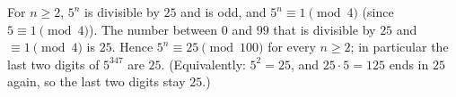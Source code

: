 For $n\ge2$, $5^n$ is divisible by $25$ and is odd, and $5^n\equiv1\pmod4$ (since $5\equiv1\pmod 4$). The number between $0$ and $99$ that is divisible by $25$ and $\equiv1\pmod4$ is $25$. Hence $5^{n}\equiv25\pmod{100}$ for every $n\ge2$; in particular the last two digits of $5^{347}$ are $\boxed{25}$. (Equivalently: $5^2=25$, and $25\cdot5=125$ ends in $25$ again, so the last two digits stay $25$.)
